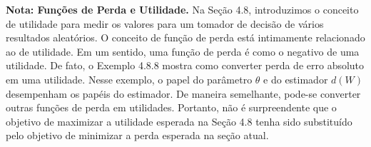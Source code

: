 \vspace{1cm}
\noindent\textbf{Nota: Funções de Perda e Utilidade.} Na Seção 4.8, introduzimos o conceito de utilidade para medir os valores para um tomador de decisão de vários resultados aleatórios. O conceito de função de perda está intimamente relacionado ao de utilidade. Em um sentido, uma função de perda é como o negativo de uma utilidade. De fato, o Exemplo 4.8.8 mostra como converter perda de erro absoluto em uma utilidade. Nesse exemplo, o papel do parâmetro $\theta$ e do estimador $d(W)$ desempenham os papéis do estimador. De maneira semelhante, pode-se converter outras funções de perda em utilidades. Portanto, não é surpreendente que o objetivo de maximizar a utilidade esperada na Seção 4.8 tenha sido substituído pelo objetivo de minimizar a perda esperada na seção atual.

